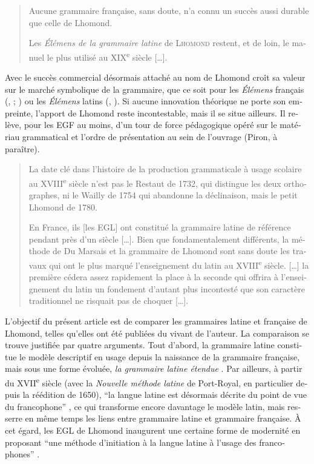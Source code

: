 \documentclass[output=paper]{../langscibook}
\begin{document}
\begin{otherlanguage}{french}
\begin{quote}
    Aucune grammaire française, sans doute, n’a connu un succès aussi durable que celle de Lhomond. \citep[63]{chervel_et_1977}

    Les \textit{Élémens de la grammaire latine} de \textsc{Lhomond} restent, et de loin, le manuel le plus utilisé au XIX\textsuperscript{e} siècle […]. \citep[16]{chervel_rhetorique_1979}
\end{quote}

Avec le succès commercial désormais attaché au nom de Lhomond croît sa valeur sur le marché symbolique de la grammaire, que ce soit pour les \textit{Élémens} français (\citealt{chervel_et_1977}, \citeyear{chervel_histoire_2006}; \citealt{colombat_histoire_2010}) ou les \textit{Élémens} latins (\citealt{chervel_et_1977}, \citealt{colombat_grammaire_1999}). Si aucune innovation théorique ne porte son empreinte, l’apport de Lhomond reste incontestable, mais il se situe ailleurs. Il relève, pour les EGF au moins, d’un tour de force pédagogique opéré sur le matériau grammatical et l’ordre de présentation au sein de l’ouvrage (Piron, à paraître). 

\begin{quote}
La date clé dans l’histoire de la production grammaticale à usage scolaire au XVIII\textsuperscript{e} siècle n’est pas le Restaut de 1732, qui distingue les deux orthographes, ni le Wailly de 1754 qui abandonne la déclinaison, mais le petit Lhomond de 1780. \citep[220]{chervel_histoire_2006}

En France, ils [les EGL] ont constitué la grammaire latine de référence pendant près d’un siècle […]. Bien que fondamentalement différents, la méthode de Du Marsais et la grammaire de Lhomond sont sans doute les travaux qui ont le plus marqué l’enseignement du latin au XVIII\textsuperscript{e} siècle. […] la première cédera assez rapidement la place à la seconde qui offrira à l’enseignement du latin un fondement d’autant plus incontesté que son caractère traditionnel ne risquait pas de choquer […]. \citep[106]{colombat_grammaire_1999}
\end{quote}

L’objectif du présent article est de comparer les grammaires latine et française de Lhomond, telles qu’elles ont été publiées du vivant de l’auteur. La comparaison se trouve justifiée par quatre arguments. Tout d’abord, la grammaire latine constitue le modèle descriptif en usage depuis la naissance de la grammaire française, mais sous une forme évoluée, \textit{la grammaire latine étendue} \citep{auroux_revolution_1994}. Par ailleurs, à partir du XVII\textsuperscript{e} siècle (avec la \textit{Nouvelle méthode latine} de Port-Royal, en particulier depuis la réédition de 1650), “la langue latine est désormais décrite du point de vue du francophone” \citep[11]{colombat_a_1995}, ce qui transforme encore davantage le modèle latin, mais resserre en même temps les liens entre grammaire latine et grammaire française. À cet égard, les EGL de Lhomond inaugurent une certaine forme de modernité en proposant “une méthode d’initiation à la langue latine à l’usage des francophones” \citep[166]{colombat_grammaire_1999}.


\end{otherlanguage}
\end{document}

